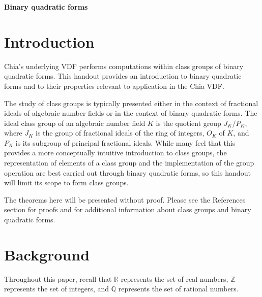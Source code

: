 \documentclass{article}
\theoremstyle{definition}
\theoremstyle{theorem}
\theoremstyle{example}
\theoremstyle{corollary}
\begin{document}
\begin{center}
\LARGE{\textbf{Binary quadratic forms}}
\end{center}



\bigskip
\bigskip
\bigskip




\bigskip

\section{Introduction}

\bigskip

Chia's underlying VDF performs computations within class groups of binary quadratic forms. This handout provides an introduction to binary quadratic forms and to their properties relevant to application in the Chia VDF.

\bigskip

The study of class groups is typically presented either in the context of fractional ideals of algebraic number fields or in the context of binary quadratic forms. The ideal class group of an algebraic number field \(K\) is the quotient group \(J_{K}/P_{K}\), where \(J_{K}\) is the group of fractional ideals of the ring of integers, \(O_{K}\) of \(K\), and \(P_{K}\) is its subgroup of principal fractional ideals. While many feel that this provides a more conceptually intuitive introduction to class groups, the representation of elements of a class group and the implementation of the group operation are best carried out through binary quadratic forms, so this handout will limit its scope to form class groups.

\bigskip

The theorems here will be presented without proof. Please see the References section for proofs and for additional information about class groups and binary quadratic forms.








\bigskip

\section{Background}

\bigskip

Throughout this paper, recall that \(\mathbb{R}\) represents the set of real numbers, \(\mathbb{Z}\) represents the set of integers, and \(\mathbb{Q}\) represents the set of rational numbers.
\end{document}
